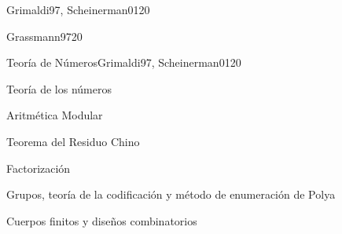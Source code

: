 \begin{syllabus}
\begin{unit}{\ALNUEVEDef}{Grimaldi97, Scheinerman01}{20}
   \begin{topics}
         \item  \ALNUEVEDef
         \item  \ALNUEVETopicRevision
         \item  \ALNUEVETopicCriptografia
        \item   \ALNUEVETopicCriptografiade
        \item   \ALNUEVETopicFirmas
        \item   \ALNUEVETopicProtocolos
        \item   \ALNUEVETopicAplicaciones
   \end{topics}

   \begin{unitgoals}
         \item \ALNUEVEObjONE
         \item \ALNUEVEObjTWO
          \item \ALNUEVEObjTHREE
   \end{unitgoals}
\end{unit}

\begin{unit}{\IMFOURDef}{Grassmann97}{20}
   \begin{topics}
         \item \IMFOURDef
         \item \IMFOURTopicMapeo
         \item \IMFOURTopicEntidad
         \item \IMFOURTopicAlgebra
   \end{topics}

   \begin{unitgoals}
         \item \IMFOURObjONE
         \item \IMFOURObjTWO
         \item \IMFOURObjTHREE
         \item \IMFOURObjFOUR
         \item \IMFOURObjCINCO
   \end{unitgoals}
\end{unit}

\begin{unit}{Teoría de Números}{Grimaldi97, Scheinerman01}{20}
   \begin{topics}
      \item Teoría de los números
     \item Aritmética  Modular
      \item Teorema del Residuo Chino
       \item Factorización
      \item Grupos, teoría de la codificación y método de enumeración de Polya
      \item Cuerpos finitos y diseños combinatorios
   \end{topics}


\end{unit}
\end{syllabus}
